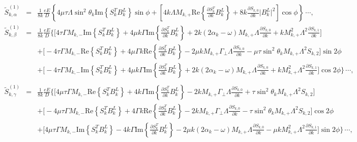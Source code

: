 \documentclass[reprint,amsmath,amssymb,aps,prb]{revtex4-1}
\begin{document}
\begin{widetext}
%
\begin{eqnarray}
 \tilde{S}_{k,\alpha}^{(1)}&=&\frac{1}{8k}\frac{eE}{D}\left\{4\mu\tau\Lambda\sin^2\theta_k\text{Im}\left\{S^T_k B^L_k\right\}\sin\phi+\left[4k\Lambda M_{k,+}  \text{Re}\left\{\frac{\partial S^T_k}{\partial k} B^L_k\right\}+8k\frac{\partial S_{k,0}}{\partial k}\lvert B_k^L\rvert^2\right]\cos\phi\right\}\,\cdots, \label{S1alpha} \\ 
 \tilde{S}_{k,\beta}^{(1)}&=&\frac{1}{8k}\frac{eE}{D}\bigg\{\Big[4\tau\Gamma M_{k,-}\text{Im}\left\{S^T_k B^L_k\right\}+4\mu k \Gamma \text{Im}\left\{\frac{\partial S^T_k}{\partial k} B^L_k\right\}+2k(2\alpha_k-\omega)M_{k,+}\Lambda\frac{\partial S_{k,0}}{\partial k}+k M_{k,+}^2\Lambda^2\frac{\partial S_{k,1}}{\partial k}\Big] \nonumber \\
 &&+\Big[-4\tau\Gamma M_{k,-}\text{Re}\left\{S^T_k B^L_k\right\}+4\mu\Gamma k \text{Re}\left\{\frac{\partial S^T_k}{\partial k} B^L_k\right\}-2\mu k M_{k,+}\Gamma_\perp\Lambda\frac{\partial S_{k,0}}{\partial k}-\mu\tau\sin^2\theta_kM_{k,+}\Lambda^2 S_{k,2}\Big]\sin 2\phi \nonumber \\ 
 &&+\Big[-4\tau\Gamma M_{k,-}\text{Im}\left\{S^T_k B^L_k\right\}+4\mu k \Gamma \text{Im}\left\{\frac{\partial S^T_k}{\partial k} B^L_k\right\}+2k(2\alpha_k-\omega)M_{k,+}\Lambda\frac{\partial S_{k,0}}{\partial k}+k M_{k,+}^2\Lambda^2\frac{\partial S_{k,1}}{\partial k}\Big]\cos 2\phi\bigg\}\,\cdots,\nonumber  \\  \label{S1beta} \\
\tilde{S}_{k,\gamma}^{(1)}&=&\frac{1}{8k}\frac{eE}{D}\bigg\{\Big[4\mu\tau\Gamma M_{k,-}\text{Re}\left\{S^T_k B^L_k\right\}+4 k \Gamma \text{Im}\left\{\frac{\partial S^T_k}{\partial k} B^L_k\right\}-2kM_{k,+}\Gamma_\perp\Lambda\frac{\partial S_{k,0}}{\partial k}+\tau \sin^2\theta_k M_{k,+}\Lambda^2 S_{k,2}\Big] \nonumber \\
 &&+\Big[-4\mu\tau\Gamma M_{k,-}\text{Re}\left\{S^T_k B^L_k\right\}+4\Gamma k \text{Re}\left\{\frac{\partial S^T_k}{\partial k} B^L_k\right\}-2 k M_{k,+}\Gamma_\perp\Lambda\frac{\partial S_{k,0}}{\partial k}-\tau\sin^2\theta_kM_{k,+}\Lambda^2 S_{k,2}\Big]\cos 2\phi \nonumber \\
 &&+\Big[4\mu\tau\Gamma M_{k,-}\text{Im}\left\{S^T_k B^L_k\right\}-4 k \Gamma \text{Im}\left\{\frac{\partial S^T_k}{\partial k}B^L_k\right\}-2\mu k(2\alpha_k-\omega)M_{k,+}\Lambda\frac{\partial S_{k,0}}{\partial k}-\mu k M_{k,+}^2\Lambda^2\frac{\partial S_{k,1}}{\partial k}\Big]\sin 2\phi\bigg\}\,\cdots, \nonumber \\ \label{S1gamma}

\end{eqnarray}
\end{widetext}
\end{document}
